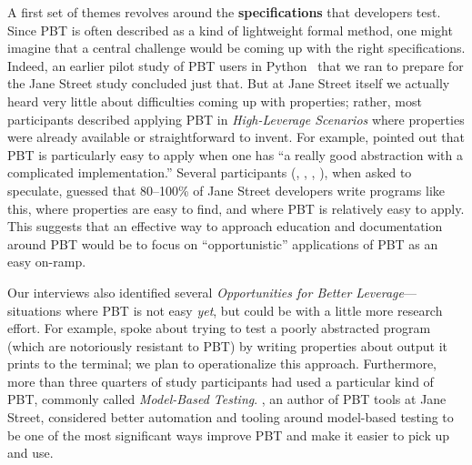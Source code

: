 \newcommand{\proptheme}[1]{{\color{nord-orange} \em #1}}
\newcommand{\gentheme}[1]{{\color{nord-green} \em #1}}
\newcommand{\evaltheme}[1]{{\color{nord-purple} \em #1}}
A first set of
themes revolves around the {\bf specifications} that developers test.
Since
PBT is often described as a kind of lightweight formal method, one
might imagine that a central challenge would be coming up with the
right specifications. Indeed, an earlier pilot study of PBT users in
Python~\cite{goldstein_problems_2022} that we ran to prepare for the Jane Street
study\iflater{}\fi{}
concluded just that.
  But at Jane Street itself
we actually heard very little about difficulties coming up with
properties; rather, most participants described applying PBT in
\proptheme{High-Leverage Scenarios} where properties were already
available or straightforward to invent. For example,  pointed out
that PBT is particularly easy to apply when one has ``a really good abstraction
with a complicated implementation.''
Several participants (, ,
, ), when asked to speculate, guessed
that 80--100\% of Jane Street
developers write programs like this, where properties are easy to find, and
where PBT is relatively easy to apply.  This suggests that an effective way to
approach education and documentation around PBT would be to focus on
``opportunistic'' applications of PBT as an easy on-ramp.

Our interviews also identified several \proptheme{Opportunities for Better
Leverage}---situations where PBT is not easy {\em yet}, but could be with a
little more research effort. For example,  spoke about trying to
test a poorly abstracted program (which are notoriously resistant to PBT) by
writing properties about output it prints to the terminal; we plan to
operationalize this approach.
Furthermore, more than three quarters of study participants had used a
particular kind of PBT, commonly called
\proptheme{Model-Based Testing}.
, an author of PBT tools at Jane Street, considered better
automation and tooling around model-based testing to be one of the most
significant ways improve PBT and make it easier to pick up and use.


